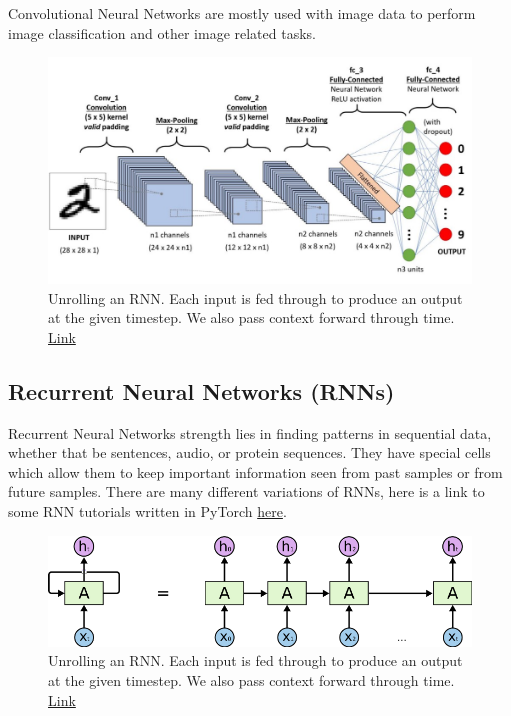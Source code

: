 \documentclass{article}
\begin{document}
Convolutional Neural Networks are mostly used with image data to perform image classification and other image related tasks.

\begin{figure}[H]
    \centering
    \includegraphics[width=4.5in]{cnn.jpeg}
    \caption{Unrolling an RNN. Each input is fed through to produce an output at the given timestep. We also pass context forward through time. \href{https://towardsdatascience.com/a-comprehensive-guide-to-convolutional-neural-networks-the-eli5-way-3bd2b1164a53}{Link}}
\end{figure}

\subsection{Recurrent Neural Networks (RNNs)} 

Recurrent Neural Networks strength lies in finding patterns in sequential data, whether that be sentences, audio, or protein sequences. They have special cells which allow them to keep important information seen from past samples or from future samples. There are many different variations of RNNs, here is a link to some RNN tutorials written in PyTorch \href{https://github.com/yunjey/pytorch-tutorial/tree/master/tutorials/02-intermediate}{here}.

\begin{figure}[H]
    \centering
    \includegraphics[width=4.5in]{rnn.png}
    \caption{Unrolling an RNN. Each input is fed through to produce an output at the given timestep. We also pass context forward through time. \href{https://medium.com/@jianqiangma/all-about-recurrent-neural-networks-9e5ae2936f6e}{Link}}
\end{figure}
\end{document}

